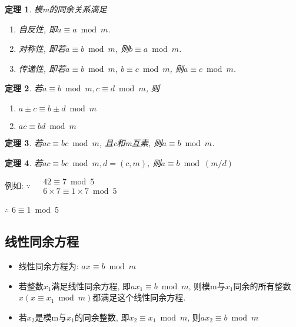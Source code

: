 \documentclass[UTF8]{ctexart}
\newtheorem{theorem}{\hspace{2em}定理}[section]
\begin{document}
    \begin{theorem}
        模m的同余关系满足
        \begin{enumerate}
            \renewcommand\labelenumi{(\theenumi)}
            \item 自反性, 即$a\equiv a \bmod m$.
            \item 对称性, 即若$a\equiv b \bmod m$, 则$b\equiv a \bmod m$.
            \item 传递性, 即若$a\equiv b \bmod m$, $b\equiv c \bmod m$, 则$a\equiv c \bmod m$.
        \end{enumerate}
    \end{theorem}
    \begin{theorem}
        若$a\equiv b \bmod m, c\equiv d \bmod m$, 则
        \begin{enumerate}
            \renewcommand\labelenumi{(\theenumi)}
            \item $a\pm c\equiv b\pm d \bmod m$
            \item $ac\equiv bd \bmod m$
        \end{enumerate}
    \end{theorem}
    \begin{theorem}
        若$ac\equiv bc \bmod m$, 且c和m互素, 则$a\equiv b \bmod m$.
    \end{theorem}
    \begin{theorem}
        若$ac\equiv bc \bmod m, d=(c,m)$, 则$a\equiv b \bmod (m/d)$
    \end{theorem}

    例如:
    $\because$
    $
    \begin{aligned}
        &42\equiv 7\bmod 5\\
        &6\times 7\equiv 1\times 7\bmod 5
    \end{aligned}
    $

    $\therefore$ $6\equiv 1\bmod 5$

    \subsection{线性同余方程}
    \begin{itemize}
        \item 线性同余方程为: $ax\equiv b\bmod m$
        \item 若整数$x_1$满足线性同余方程, 即$ax_1\equiv b\bmod m$, 则模m与$x_1$同余的所有整数$x(x\equiv x_1\bmod m)$都满足这个线性同余方程.
        \item 若$x_2$是模m与$x_1$的同余整数, 即$x_2\equiv x_1\bmod m$, 则$ax_2\equiv b\bmod m$
    \end{itemize}
\end{document}
